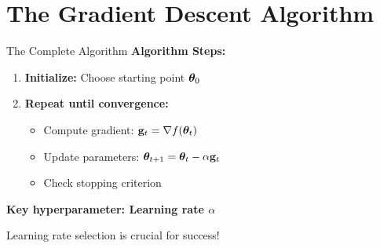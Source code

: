 \documentclass[usenames,dvipsnames]{beamer}
\begin{document}
  \section{The Gradient Descent Algorithm}

  \begin{frame}{The Complete Algorithm}
    \textbf{Algorithm Steps:}
    \begin{enumerate}[<+->]
        \item \textbf{Initialize:} Choose starting point $\boldsymbol{\theta}_0$
        \item \textbf{Repeat until convergence:}
        \begin{itemize}
            \item Compute gradient: $\mathbf{g}_t = \nabla f(\boldsymbol{\theta}_t)$
            \item Update parameters: $\boldsymbol{\theta}_{t+1} = \boldsymbol{\theta}_t - \alpha \mathbf{g}_t$  
            \item Check stopping criterion
        \end{itemize}
    \end{enumerate}
    
    \pause
    \textbf{Key hyperparameter: Learning rate $\alpha$}
    
    \pause
    \begin{keypointsbox}{}
    Learning rate selection is crucial for success!
    \end{keypointsbox}
  \end{frame}
\end{document}
